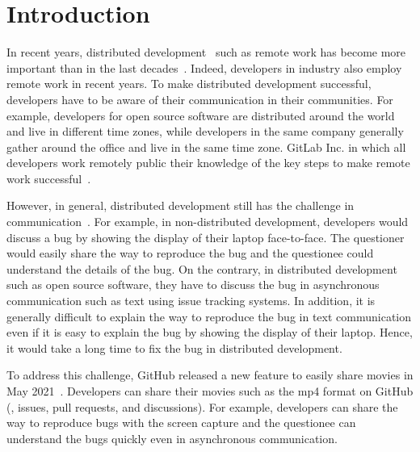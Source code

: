 \section{Introduction}
\label{sec:intro}
In recent years, distributed development~\citep{sengupta2006ICSE} 
such as remote work has become more important 
than in the last decades~\citep{ford2021TOSEM}. 
Indeed, developers in industry also employ remote work
in recent years.
To make distributed development successful, 
developers have to be aware of their communication 
in their communities. 
For example, developers for open source software are 
distributed around the world and live in different time zones, 
while developers in the same company generally gather around 
the office and live in the same time zone. 
GitLab Inc. in which all developers work remotely 
public their knowledge of the key steps 
to make remote work successful~\citep{gitlab2020remoteplaybook}. 


However, in general, distributed development still has 
the challenge in communication~\citep{ford2021TOSEM}. 
For example, in non-distributed development, 
developers would discuss a bug by showing the display of 
their laptop face-to-face. 
The questioner would easily share the way to reproduce the bug 
and the questionee could understand the details of the bug. 
On the contrary, in distributed development such as 
open source software, they have to discuss the bug 
in asynchronous communication 
such as text using issue tracking systems. 
In addition, it is generally difficult to explain the way 
to reproduce the bug in text communication 
even if it is easy to explain the bug by showing 
the display of their laptop. 
Hence, it would take a long time to fix the bug 
in distributed development. 


To address this challenge, GitHub released a new feature 
to easily share movies in May 2021~\citep{github-video-blog}. 
Developers can share their movies such as the mp4 format 
on GitHub (\eg,  issues, pull requests, and discussions). 
For example, developers can share the way to reproduce bugs 
with the screen capture and the questionee can understand 
the bugs quickly even in asynchronous communication. 



